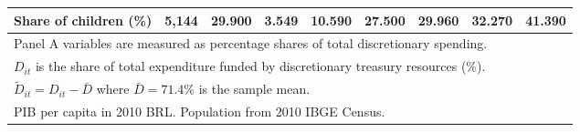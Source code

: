 \documentclass[12pt, a4paper]{article}
\begin{document}
\begin{table}[htbp]
{\begin{tabular}{lrrrrrrrr}
\quad Share of children (\%) & 5,144 & 29.900 & 3.549 & 10.590 & 27.500 & 29.960 & 32.270 & 41.390 \\
\hline\hline
\multicolumn{9}{l}{\footnotesize Panel A variables are measured as percentage shares of total discretionary spending.} \\
\multicolumn{9}{l}{\footnotesize $D_{it}$ is the share of total expenditure funded by discretionary treasury resources (\%).} \\
\multicolumn{9}{l}{\footnotesize $\tilde{D}_{it} = D_{it} - \bar{D}$ where $\bar{D} = 71.4\%$ is the sample mean.} \\
\multicolumn{9}{l}{\footnotesize PIB per capita in 2010 BRL. Population from 2010 IBGE Census.} \\
\end{tabular}%
}
\end{table}
\end{document}
